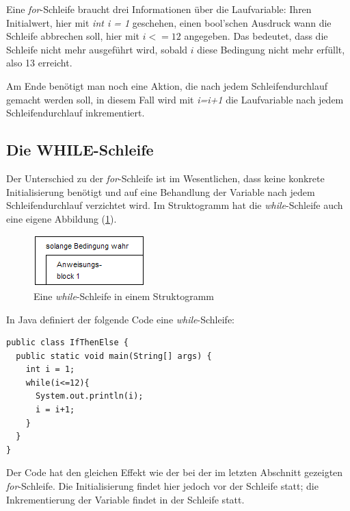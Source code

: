 Eine \textit{for}-Schleife braucht drei Informationen über die Laufvariable: Ihren Initialwert, hier mit \textit{int i = 1} geschehen, einen bool'schen Ausdruck wann die Schleife abbrechen soll, hier mit $i <=12$ angegeben. Das bedeutet, dass die Schleife nicht mehr ausgeführt wird, sobald $i$ diese Bedingung nicht mehr erfüllt, also 13 erreicht.

Am Ende benötigt man noch eine Aktion, die nach jedem Schleifendurchlauf gemacht werden soll, in diesem Fall wird mit \textit{i=i+1} die Laufvariable nach jedem Schleifendurchlauf inkrementiert.

\subsection{Die WHILE-Schleife}

Der Unterschied zu der \textit{for}-Schleife ist im Wesentlichen, dass keine konkrete Initialisierung benötigt und auf eine Behandlung der Variable nach jedem Schleifendurchlauf verzichtet wird. Im Struktogramm hat die \textit{while}-Schleife auch eine eigene Abbildung (\ref{while}).

\begin{figure}
	\begin{center}\includegraphics[scale=1]{images/while.png}\end{center}
	\caption{Eine \textit{while}-Schleife in einem Struktogramm}
	\label{while}
\end{figure}

In Java definiert der folgende Code eine \textit{while}-Schleife:

\begin{minipage}{\textwidth}
\begin{lstlisting}
public class IfThenElse {
  public static void main(String[] args) {
    int i = 1;
    while(i<=12){
      System.out.println(i);
      i = i+1;
    }
  }
}
\end{lstlisting}
\end{minipage}

Der Code hat den gleichen Effekt wie der bei der im letzten Abschnitt gezeigten \textit{for}-Schleife. Die Initialisierung findet hier jedoch vor der Schleife statt; die Inkrementierung der Variable findet in der Schleife statt.

